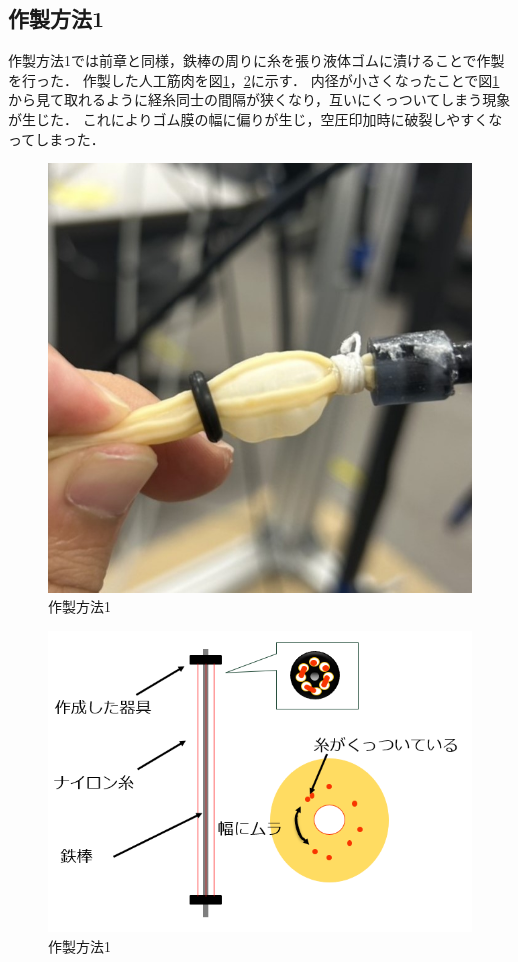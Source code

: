 \subsection{作製方法1}
作製方法1では前章と同様，鉄棒の周りに糸を張り液体ゴムに漬けることで作製を行った．
作製した人工筋肉を図\ref{fig:18}，\ref{fig:19}に示す．
内径が小さくなったことで図\ref{fig:18}から見て取れるように経糸同士の間隔が狭くなり，互いにくっついてしまう現象が生じた．
これによりゴム膜の幅に偏りが生じ，空圧印加時に破裂しやすくなってしまった．
\begin{figure}[!h]
  \centering  %
  \includegraphics[scale=0.3]{pic/17.jpg}
  \caption{作製方法1}
  \label{fig:18}
\end{figure}
\begin{figure}[!h]
  \centering  %
  \includegraphics[scale=0.5]{pic/18.PNG}
  \caption{作製方法1}
  \label{fig:19}
\end{figure}
\newpage
